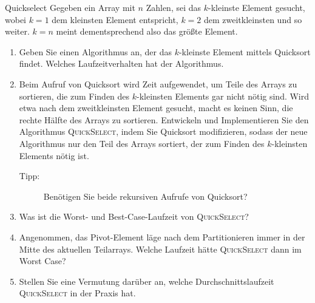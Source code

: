 \documentclass[11pt,a4paper]{article}
\begin{document}
\begin{aufgabe}{4}{Quickselect}
    Gegeben ein Array mit $n$ Zahlen, sei das $k$-kleinste Element gesucht, wobei $k = 1$ dem kleinsten Element entspricht, $k = 2$ dem zweitkleinsten und so weiter.
    $k = n$ meint dementsprechend also das größte Element.
    \begin{enumerate}
        \item Geben Sie einen Algorithmus an, der das $k$-kleinste Element mittels Quicksort findet. Welches Laufzeitverhalten hat der Algorithmus.

        \item Beim Aufruf von Quicksort wird Zeit aufgewendet, um Teile des Arrays zu sortieren, die zum Finden des $k$-kleinsten Elements gar nicht nötig sind.
        Wird etwa nach dem zweitkleinsten Element gesucht, macht es keinen Sinn, die rechte Hälfte des Arrays zu sortieren.
        Entwickeln und Implementieren Sie den Algorithmus \textsc{QuickSelect}, indem Sie Quicksort modifizieren, sodass der neue Algorithmus nur den Teil des Arrays sortiert, der zum Finden des $k$-kleinsten Elements nötig ist.
        \begin{description}
            \item[Tipp:] Benötigen Sie beide rekursiven Aufrufe von Quicksort?
        \end{description}

        \item Was ist die Worst- und Best-Case-Laufzeit von \textsc{QuickSelect}?

        \item Angenommen, das Pivot-Element läge nach dem Partitionieren immer in der Mitte des aktuellen Teil\-arrays. Welche Laufzeit hätte \textsc{QuickSelect} dann im Worst Case?

        \item Stellen Sie eine Vermutung darüber an, welche Durchschnittslaufzeit \textsc{QuickSelect} in der Praxis hat.
    \end{enumerate}
\end{aufgabe}
\end{document}

